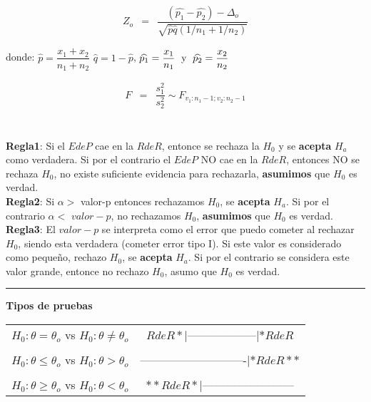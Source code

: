 \documentclass[base=hide,9pt]{elegantbook}
\begin{document}
\begin{multicols}{2}
\begin{eqnarray}
Z_{o}&=& \dfrac{(\widehat{p_{1}}-\widehat{p_{2}})-\Delta_{o}}{\sqrt{\widehat{p}\widehat{q}(1/n_{1}+1/n_{2})}}
\end{eqnarray}
\begin{center}
donde: $\widehat{p}=\dfrac{x_{1}+x_{2}}{n_{1}+n_{2}}$ \hspace{.2cm} $\widehat{q}=1-\widehat{p}$, \hspace{.2cm}
$\widehat{p_{1}}=\dfrac{x_{1}}{n_{1}} \hspace{.1cm} \text{ y } \hspace{.1cm}\widehat{p_{2}}=\dfrac{x_{2}}{n_{2}}$
\end{center}
\begin{eqnarray}
F&=& \dfrac{s_{1}^{2}}{s_{2}^{2}} \sim F_{v_{1}:n_{1}-1; v_{2}: n_{2}-1}
\end{eqnarray}
\\
\\
\textcolor{col3}{\bf \large Regla1}:  \hspace{.3cm}Si el $EdeP$ cae en la $RdeR$, entonce se rechaza la $H_{0}$ y se {\bf acepta} $H_{a}$ como verdadera. Si por el contrario el $EdeP$ NO cae en la $RdeR$, entonces NO se rechaza $H_{0}$, no existe suficiente evidencia para rechazarla, {\bf asumimos} que $H_{0}$ es verdad.\\

\textcolor{col5}{\bf \large  Regla2}: \hspace{.3cm}Si $\alpha >$ valor-p entonces rechazamos $H_{0}$, se {\bf acepta} $H_{a}$. Si por el contrario $\alpha <$ $valor-p$, no rechazamos $H_{0}$, {\bf asumimos} 	que $H_{0}$ es verdad.\\

\textcolor{col3}{\bf \large Regla3}: \hspace{.3cm} El $valor-p$ se interpreta como el error que puedo cometer al rechazar $H_{0}$, siendo esta verdadera (cometer error tipo I). Si este valor es considerado como pequeño, rechazo $H_{0}$, se {\bf acepta} $H_{a}$. Si por el contrario se considera este valor grande, entonce no rechazo $H_{0}$, asumo que $H_{0}$ es verdad.\\

\rule{9cm}{1pt}
\textcolor{col4}{\bf Tipos de pruebas} \\
{\small
	\begin{tabular}{lc}
		$H_{0}: \theta = \theta_{o}$ vs $H_{0}: \theta \neq \theta_{o}$ & $RdeR*|$------------------$|*RdeR$\\
		&\\
		$H_{0}: \theta \leq \theta_{o}$ vs $H_{0}: \theta > \theta_{o}$ & ----------------------------$|*RdeR**$\\
		&\\
		$H_{0}: \theta \geq \theta_{o}$ vs $H_{0}: \theta < \theta_{o}$ & $**RdeR*|$------------------------\\
		

\end{tabular}}
\end{multicols}
\end{document}
